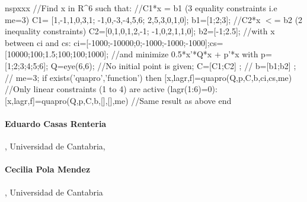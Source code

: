 \begin{examples}
  \begin{mintednsp}{nspxxx}
    //Find x in R^6 such that:
    //C1*x = b1 (3 equality constraints i.e me=3)
    C1= [1,-1,1,0,3,1;
        -1,0,-3,-4,5,6;
        2,5,3,0,1,0];
    b1=[1;2;3];
    //C2*x $<$= b2 (2 inequality constraints)
    C2=[0,1,0,1,2,-1;  -1,0,2,1,1,0];
    b2=[-1;2.5];
    //with  x between ci and cs:
    ci=[-1000;-10000;0;-1000;-1000;-1000];cs=[10000;100;1.5;100;100;1000];
    //and minimize 0.5*x'*Q*x + p'*x with
    p=[1;2;3;4;5;6]; Q=eye(6,6);
    //No initial point is given;
    C=[C1;C2] ; //
    b=[b1;b2] ;  //
    me=3;
    if exists('quapro','function') then 
     [x,lagr,f]=quapro(Q,p,C,b,ci,cs,me)
     //Only linear constraints (1 to 4) are active (lagr(1:6)=0):
     [x,lagr,f]=quapro(Q,p,C,b,[],[],me)   //Same result as above 
    end
\end{mintednsp} 
\end{examples}
\begin{manseealso}
\end{manseealso}

\begin{authors}
  \paragraph{Eduardo Casas  Renteria} , Universidad de Cantabria,
  \paragraph{Cecilia Pola Mendez}  , Universidad de Cantabria 
\end{authors}
